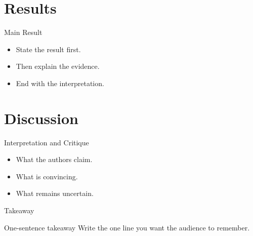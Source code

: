 \documentclass[aspectratio=169]{beamer}
\begin{document}
\section{Results}

\begin{frame}{Main Result}
\begin{itemize}
  \item State the result first.
  \item Then explain the evidence.
  \item End with the interpretation.
\end{itemize}
\end{frame}

\section{Discussion}

\begin{frame}{Interpretation and Critique}
\begin{itemize}
  \item What the authors claim.
  \item What is convincing.
  \item What remains uncertain.
\end{itemize}
\end{frame}

\begin{frame}{Takeaway}
\begin{alertblock}{One-sentence takeaway}
Write the one line you want the audience to remember.
\end{alertblock}
\end{frame}
\end{document}
